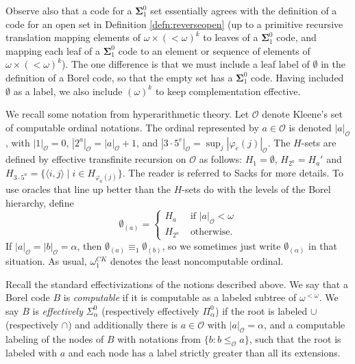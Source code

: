 \documentclass{amsart}
\theoremstyle{definition}
\theoremstyle{remark}
\newcommand{\kO}{\mathcal{O}}
\newcommand{\KO}{\mathcal{O}}
\begin{document}
Observe also that a code for a $\mathbf \Sigma^0_1$ set essentially agrees 
with the definition of a code for an open set in Definition \ref{defn:reverseopen}
(up to a primitive recursive translation mapping elements of $\omega\times(<\omega)^k$
to leaves of a $\mathbf \Sigma^0_1$ code, and mapping each leaf of a 
$\mathbf \Sigma^0_1$ code to an element or sequence of elements 
of $\omega\times(<\omega)^k$).
The one difference is that we must include a leaf label of $\emptyset$
in the definition of a Borel code, so that the empty set 
has a $\mathbf\Sigma^0_1$ code.  Having included $\emptyset$ as a label,
we also include $(\omega)^k$ to keep complementation effective.



We recall some notation from hyperarithmetic theory. 
Let $\mathcal{O}$ denote Kleene's set of computable ordinal notations. 
The ordinal represented by $a \in \mathcal{O}$ is denoted $|a|_\mathcal{O}$, 
with $|1|_\KO = 0$, $|2^a|_\KO = |a|_\KO + 1$, and 
$|3\cdot 5^e|_\KO = \sup_j |\varphi_e(j)|_\KO$.
The $H$-sets are defined by effective transfinite
recursion on $\mathcal{O}$ as follows: $H_1 = \emptyset$, $H_{2^a} = H_a'$ and $H_{3 \cdot 5^a}
= \{ \langle i,j \rangle \mid i \in H_{\varphi_a(j)} \}$. 
The reader is referred to Sacks \cite{sacks} for more
details.  To use oracles that line up better than the $H$-sets do
with the levels of the Borel hierarchy, define
$$\emptyset_{(a)} = \begin{cases} H_a & \text{ if } |a|_\kO < \omega\\
H_{2^a} & \text{ otherwise.}\end{cases}$$
If $|a|_\kO = |b|_\kO = \alpha$, then $\emptyset_{(a)} \equiv_1 \emptyset_{(b)}$,
so we sometimes just write $\emptyset_{(\alpha)}$ in that situation.
As usual,
$\omega_1^{CK}$ denotes the least noncomputable ordinal.

Recall the standard effectivizations of the notions described above.
We say that a Borel code $B$ is \emph{computable} if it is computable
as a labeled subtree of $\omega^{<\omega}$.  We say $B$ is 
\emph{effectively} $\Sigma^0_\alpha$ (respectively effectively $\Pi^0_\alpha$)
if the root is labeled $\cup$ (respectively $\cap$) and additionally there 
is $a \in \kO$ with $|a|_\kO = \alpha$, and a computable labeling
of the nodes of $B$ with notations from $\{ b : b \leq_\kO a\}$,
such that the root is labeled with $a$ and each node has 
a label strictly greater than all its extensions.  
\end{document}
